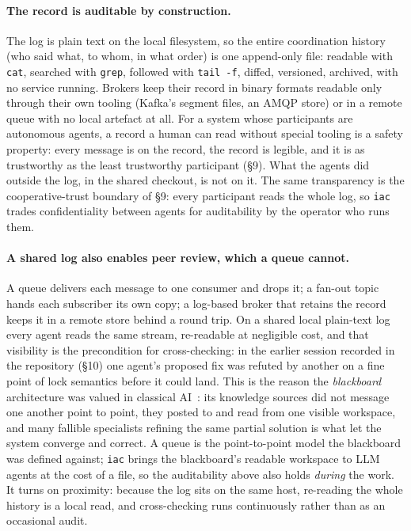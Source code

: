 \documentclass[11pt]{article}
\newcommand{\code}[1]{\texttt{#1}}
\begin{document}
\paragraph{The record is auditable by construction.} The log is plain text on the local filesystem, so the entire coordination history (who said what, to whom, in what order) is one append-only file: readable with \code{cat}, searched with \code{grep}, followed with \code{tail~-f}, diffed, versioned, archived, with no service running. Brokers keep their record in binary formats readable only through their own tooling (Kafka's segment files, an AMQP store) or in a remote queue with no local artefact at all. For a system whose participants are autonomous agents, a record a human can read without special tooling is a safety property: every message is on the record, the record is legible, and it is as trustworthy as the least trustworthy participant (\S9). What the agents did outside the log, in the shared checkout, is not on it. The same transparency is the cooperative-trust boundary of \S9: every participant reads the whole log, so \code{iac} trades confidentiality between agents for auditability by the operator who runs them.

\paragraph{A shared log also enables peer review, which a queue cannot.} A queue delivers each message to one consumer and drops it; a fan-out topic hands each subscriber its own copy; a log-based broker that retains the record keeps it in a remote store behind a round trip. On a shared local plain-text log every agent reads the same stream, re-readable at negligible cost, and that visibility is the precondition for cross-checking: in the earlier session recorded in the repository (\S10) one agent's proposed fix was refuted by another on a fine point of lock semantics before it could land. This is the reason the \emph{blackboard} architecture was valued in classical AI~\cite{blackboard}: its knowledge sources did not message one another point to point, they posted to and read from one visible workspace, and many fallible specialists refining the same partial solution is what let the system converge and correct. A queue is the point-to-point model the blackboard was defined against; \code{iac} brings the blackboard's readable workspace to LLM agents at the cost of a file, so the auditability above also holds \emph{during} the work. It turns on proximity: because the log sits on the same host, re-reading the whole history is a local read, and cross-checking runs continuously rather than as an occasional audit.
\end{document}
